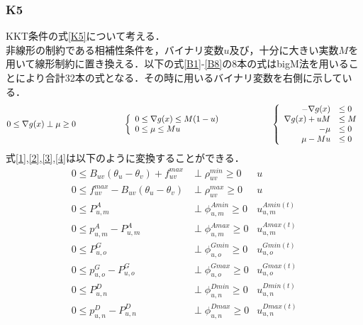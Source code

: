\documentclass[a4j,10.5pt]{jarticle}
\begin{document}
\subsubsection{K5}
KKT条件の式\ref{K5}について考える．\\
非線形の制約である相補性条件を，バイナリ変数$u$及び，十分に大きい実数$M$を用いて線形制約に置き換える．以下の式\ref{B1}-\ref{B8}の8本の式はbigM法を用いることにより合計32本の式となる．その時に用いるバイナリ変数を右側に示している．
\begin{align}
0\leq \nabla g(x) \perp \mu \geq 0\hspace{20mm}
\left\{
\begin{array}{l}
0\leq \nabla g(x) \leq M(1-u)\\
0\leq \mu \leq Mu 
\end{array}
\right.\hspace{20mm}
\left\{
\begin{array}{rl}
- \nabla g(x)&\leq 0\\
 \nabla g(x)+uM &\leq M\\
-\mu &\leq 0\\
\mu -Mu &\leq 0
\end{array}
\right.
\end{align}
式\ref{1},\ref{2},\ref{3},\ref{4}は以下のように変換することができる．
\begin{align}
0\le B_{uv}(\theta_u-\theta_v)+f_{uv}^{max}&\perp \rho_{uv}^{min}\ge 0&u_{}^{}\label{B1}\tag{B1}\\
0\le f_{uv}^{max}-B_{uv}(\theta_u-\theta_v)&\perp \rho_{uv}^{max}\ge 0&u_{}^{}\label{B2}\tag{B2}\\
0\le P_{u,m}^A&\perp \phi_{u,m}^{Amin}\ge 0&u_{u,m}^{Amin(t)}\label{B3}\tag{B3}\\
0\le p_{u,m}^A-P_{u,m}^A&\perp \phi_{u,m}^{Amax}\ge0&u_{u,m}^{Amax(t)}\label{B4}\tag{B4}\\
0\le P_{u,o}^G&\perp \phi_{u,o}^{Gmin}\ge 0&u_{u,o}^{Gmin(t)}\label{B5}\tag{B5}\\
0\le p_{u,o}^G-P_{u,o}^G&\perp \phi_{u,o}^{Gmax} \ge0&u_{u,o}^{Gmax(t)}\label{B6}\tag{B6}\\
0\le P_{u,n}^D&\perp \phi_{u,n}^{Dmin}\ge 0&u_{u,n}^{Dmin(t)}\label{B7}\tag{B7}\\
0\le p_{u,n}^D-P_{u,n}^D&\perp \phi_{u,n}^{Dmax}\ge0&u_{u,n}^{Dmax(t)}\label{B8}\tag{B8}
\end{align}
\newpage
\end{document}
